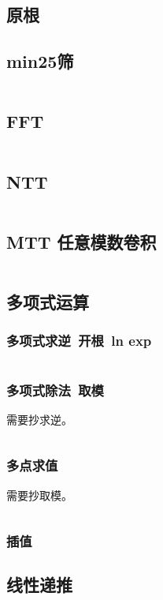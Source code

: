 \documentclass[titlepage, a4paper]{article}
\begin{document}
\begin{multicols}{2}
\begin{spacing}{0.6}
				\subsection{原根}
					
				\subsection{min25筛}
					\inputminted{cpp}{src/Math/min_25筛.cpp}
				\subsection{FFT}
					\inputminted{cpp}{src/Math/FFT.cpp}
				\subsection{NTT}
					\inputminted{cpp}{src/Math/NTT.cpp}
				\subsection{MTT 任意模数卷积}
					\inputminted{cpp}{src/Math/MTT.cpp}
				\subsection{多项式运算}
					\subsubsection{多项式求逆\ 开根\ ln exp}
						\inputminted{cpp}{src/Math/多项式运算.cpp}
					\subsubsection{多项式除法\ 取模}
						需要抄求逆。
						\inputminted{cpp}{src/Math/多项式取模.cpp}
					\subsubsection{多点求值}
						需要抄取模。
						\inputminted{cpp}{src/Math/多点求值.cpp}
					\subsubsection{插值}
						
				\subsection{线性递推}

\end{spacing}
\end{multicols}
\end{document}
